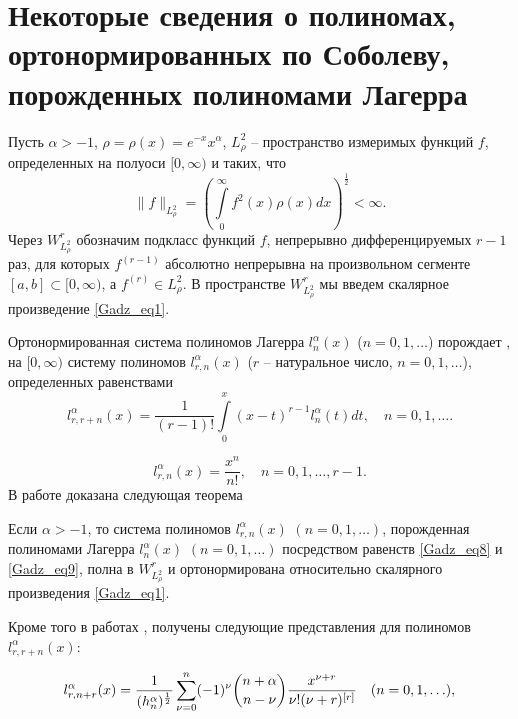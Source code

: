 \section{Некоторые сведения о полиномах, ортонормированных по Соболеву, порожденных полиномами Лагерра}
Пусть $\alpha>-1$, $\rho=\rho(x)=e^{-x}x^\alpha$, $L^2_\rho$ -- пространство измеримых функций $f$, определенных на полуоси $[0, \infty)$ и таких, что
$$
\|f\|_{L^2_\rho}=\left(\int\limits_0^{\infty}f^2(x)\rho(x)dx\right)^\frac{1}{2}<\infty.
$$
Через $W^r_{L^2_\rho}$ обозначим подкласс функций $f$, непрерывно дифференцируемых $r-1$ раз, для которых $f^{(r-1)}$ абсолютно непрерывна на произвольном сегменте $[a, b]\subset[0, \infty)$, а $f^{(r)}\in L^2_\rho$.    В пространстве $W^r_{L^2_\rho}$ мы введем скалярное произведение \eqref{Gadz_eq1}.

Ортонормированная система полиномов Лагерра $l_{n}^\alpha(x)$ ($n=0, 1, \ldots$) порождает \cite{Gadz1}, \cite{Gadz2} на $[0, \infty)$ систему полиномов $l_{r,n}^\alpha(x)$ ($r$ -- натуральное число, $n=0, 1, \ldots$), определенных равенствами
\begin{equation}\label{Gadz_eq8}
l_{r,r+n}^{\alpha}(x) =\frac{1}{(r-1)!}\int\limits_{0}^x(x-t)^{r-1}l_{n}^{\alpha}(t)dt, \quad n=0,1,\ldots.
\end{equation}

\begin{equation}\label{Gadz_eq9}
l_{r,n}^{\alpha}(x) =\frac{x^n}{n!}, \quad n=0,1,\ldots, r-1.
\end{equation}
В работе \cite{Gadz2} доказана следующая теорема

\begin{theoremA}\label{RItheoA}
Если $\alpha>-1$, то система полиномов $l_{r,n}^{\alpha}(x)$ $(n=0, 1,\ldots)$, порожденная полиномами Лагерра $l_n^{\alpha}(x)$ $(n=0,1,\ldots)$ посредством равенств \eqref{Gadz_eq8} и \eqref{Gadz_eq9}, полна  в $W^r_{L^2_\rho}$ и ортонормирована относительно скалярного произведения \eqref{Gadz_eq1}.
\end{theoremA}

Кроме того в работах \cite{Gadz1}, \cite{Gadz2} получены следующие представления для полиномов $l_{r,r+n}^{\alpha}(x)$:

\begin{equation}\label{Gadz_eq10}
l_{r,n+r}^{\alpha}(x)=\frac{1}{(h_n^\alpha)^{1\over2}}
\sum\limits_{\nu=0}^{n}(-1)^\nu \binom{n+\alpha}{n-\nu}
\frac{x^{\nu+r}}{\nu!(\nu+r)^{[r]}}\quad (n=0,1,\ldots),
\end{equation}

